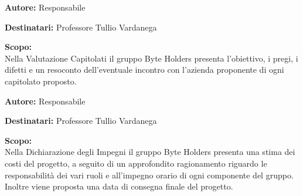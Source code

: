 \documentclass[a4paper, 11pt]{article}
\begin{document}
\begin{tcolorbox}[
    colback=LightGray,       %
    colframe=AccentColor,    %
    coltitle=white,          %
    fonttitle=\bfseries\large,
    boxrule=0.5mm,           %
    arc=2mm,                 %
    title={Valutazione Capitolati} %
]
    \textbf{\textcolor{AccentDark}{Autore:}} Responsabile  %
    
    \vspace{0.2cm} %
    \textbf{\textcolor{AccentDark}{Destinatari:}} Professore Tullio Vardanega

    \vspace{0.2cm} %

    \textbf{\textcolor{AccentDark}{Scopo:}} \\
    Nella Valutazione Capitolati il gruppo Byte Holders presenta l'obiettivo, i pregi, i difetti e un resoconto dell'eventuale incontro con l'azienda proponente di ogni capitolato proposto.
\end{tcolorbox}


\begin{tcolorbox}[
    colback=LightGray,       %
    colframe=AccentColor,    %
    coltitle=white,          %
    fonttitle=\bfseries\large,
    boxrule=0.5mm,           %
    arc=2mm,                 %
    title={Dichiarazioni Impegni} %
]
    \textbf{\textcolor{AccentDark}{Autore:}} Responsabile  %
    
    \vspace{0.2cm} %
    \textbf{\textcolor{AccentDark}{Destinatari:}} Professore Tullio Vardanega

    \vspace{0.2cm} %

    \textbf{\textcolor{AccentDark}{Scopo:}} \\
   Nella Dichiarazione degli Impegni il gruppo Byte Holders presenta una stima dei costi del progetto, a seguito di un approfondito ragionamento riguardo le responsabilità dei vari ruoli e all'impegno orario di ogni componente del gruppo. 
   Inoltre viene proposta una data di consegna finale del progetto. 
\end{tcolorbox}
\end{document}
